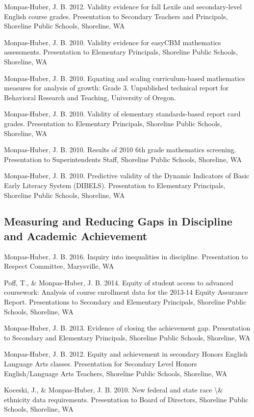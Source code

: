 \documentclass[
  letterpaper,
]{article}
\begin{document}
Monpas-Huber, J. B. 2012. Validity evidence for fall Lexile and
secondary-level English course grades. Presentation to Secondary
Teachers and Principals, Shoreline Public Schools, Shoreline, WA

Monpas-Huber, J. B. 2010. Validity evidence for easyCBM mathematics
assessments. Presentation to Elementary Principals, Shoreline Public
Schools, Shoreline, WA

Monpas-Huber, J. B. 2010. Equating and scaling curriculum-based
mathematics measures for analysis of growth: Grade 3. Unpublished
technical report for Behavioral Research and Teaching, University of
Oregon.

Monpas-Huber, J. B. 2010. Validity of elementary standards-based report
card grades. Presentation to Elementary Principals, Shoreline Public
Schools, Shoreline, WA

Monpas-Huber, J. B. 2010. Results of 2010 6th grade mathematics
screening. Presentation to Superintendents Staff, Shoreline Public
Schools, Shoreline, WA

Monpas-Huber, J. B. 2010. Predictive validity of the Dynamic Indicators
of Basic Early Literacy System (DIBELS). Presentation to Elementary
Principals, Shoreline Public Schools, Shoreline, WA

\subsection{Measuring and Reducing Gaps in Discipline and Academic
Achievement}\label{measuring-and-reducing-gaps-in-discipline-and-academic-achievement}

Monpas-Huber, J. B. 2016. Inquiry into inequalities in discipline.
Presentation to Respect Committee, Marysville, WA

Poff, T., \& Monpas-Huber, J. B. 2014. Equity of student access to
advanced coursework: Analysis of course enrollment data for the 2013-14
Equity Assurance Report. Presentations to Secondary and Elementary
Principals, Shoreline Public Schools, Shoreline, WA

Monpas-Huber, J. B. 2013. Evidence of closing the achievement gap.
Presentation to Secondary and Elementary Principals, Shoreline Public
Schools, Shoreline, WA

Monpas-Huber, J. B. 2012. Equity and achievement in secondary Honors
English Language Arts classes. Presentation for Secondary Level Honors
English/Language Arts Teachers, Shoreline Public Schools, Shoreline, WA

Koceski, J., \& Monpas-Huber, J. B. 2010. New federal and state race
\textbackslash\& ethnicity data requirements. Presentation to Board of
Directors, Shoreline Public Schools, Shoreline, WA
\end{document}
